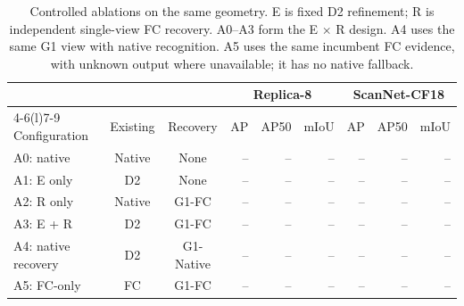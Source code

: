 \begin{table}[!ht]
\centering
\caption{Controlled ablations on the same geometry. E is fixed D2 refinement; R is independent single-view FC recovery. A0--A3 form the E $\times$ R design. A4 uses the same G1 view with native recognition. A5 uses the same incumbent FC evidence, with unknown output where unavailable; it has no native fallback.}
\label{tab:ablation}
\fontsize{9}{10.5}\selectfont
\setlength{\tabcolsep}{4pt}
\begin{tabular*}{\textwidth}{@{\extracolsep{\fill}}lccrrrrrr@{}}
\toprule
& & & \multicolumn{3}{c}{Replica-8} & \multicolumn{3}{c}{ScanNet-CF18} \\
\cmidrule(lr){4-6}\cmidrule(l){7-9}
Configuration & Existing & Recovery & AP & AP50 & mIoU & AP & AP50 & mIoU \\
\midrule
A0: native & Native & None & -- & -- & -- & -- & -- & -- \\
A1: E only & D2 & None & -- & -- & -- & -- & -- & -- \\
A2: R only & Native & G1-FC & -- & -- & -- & -- & -- & -- \\
A3: E + R & D2 & G1-FC & -- & -- & -- & -- & -- & -- \\
\midrule
A4: native recovery & D2 & G1-Native & -- & -- & -- & -- & -- & -- \\
A5: FC-only & FC & G1-FC & -- & -- & -- & -- & -- & -- \\
\bottomrule
\end{tabular*}
\end{table}
